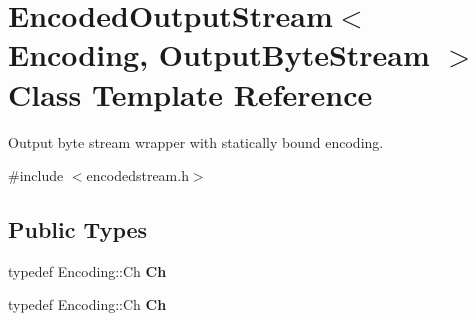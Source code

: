 \hypertarget{class_encoded_output_stream}{}\section{Encoded\+Output\+Stream$<$ Encoding, Output\+Byte\+Stream $>$ Class Template Reference}
\label{class_encoded_output_stream}


Output byte stream wrapper with statically bound encoding.  




{\ttfamily \#include $<$encodedstream.\+h$>$}

\subsection*{Public Types}
\begin{DoxyCompactItemize}
\item 
typedef Encoding\+::\+Ch {\bfseries Ch}\hypertarget{class_encoded_output_stream_aa8f494d7ee2808307fbc9cd658c0f760}{}\label{class_encoded_output_stream_aa8f494d7ee2808307fbc9cd658c0f760}

\item 
typedef Encoding\+::\+Ch {\bfseries Ch}\hypertarget{class_encoded_output_stream_aa8f494d7ee2808307fbc9cd658c0f760}{}\label{class_encoded_output_stream_aa8f494d7ee2808307fbc9cd658c0f760}

\end{DoxyCompactItemize}
